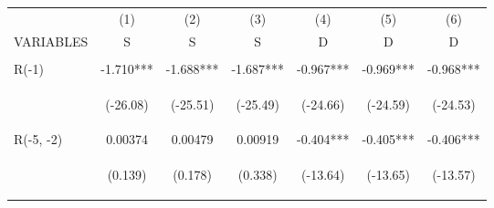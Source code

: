 \documentclass[]{article}
\begin{document}
\begin{center}
\begin{tabular}{lcccccc} \hline
 & (1) & (2) & (3) & (4) & (5) & (6) \\
VARIABLES & S & S & S & D & D & D \\ \hline
\vspace{4pt} & \begin{footnotesize}\end{footnotesize} & \begin{footnotesize}\end{footnotesize} & \begin{footnotesize}\end{footnotesize} & \begin{footnotesize}\end{footnotesize} & \begin{footnotesize}\end{footnotesize} & \begin{footnotesize}\end{footnotesize} \\
R(-1) & -1.710*** & -1.688*** & -1.687*** & -0.967*** & -0.969*** & -0.968*** \\
\vspace{4pt} & \begin{footnotesize}(-26.08)\end{footnotesize} & \begin{footnotesize}(-25.51)\end{footnotesize} & \begin{footnotesize}(-25.49)\end{footnotesize} & \begin{footnotesize}(-24.66)\end{footnotesize} & \begin{footnotesize}(-24.59)\end{footnotesize} & \begin{footnotesize}(-24.53)\end{footnotesize} \\
R(-5, -2) & 0.00374 & 0.00479 & 0.00919 & -0.404*** & -0.405*** & -0.406*** \\
\vspace{4pt} & \begin{footnotesize}(0.139)\end{footnotesize} & \begin{footnotesize}(0.178)\end{footnotesize} & \begin{footnotesize}(0.338)\end{footnotesize} & \begin{footnotesize}(-13.64)\end{footnotesize} & \begin{footnotesize}(-13.65)\end{footnotesize} & \begin{footnotesize}(-13.57)\end{footnotesize} \\

\end{tabular}
\end{center}
\end{document}
